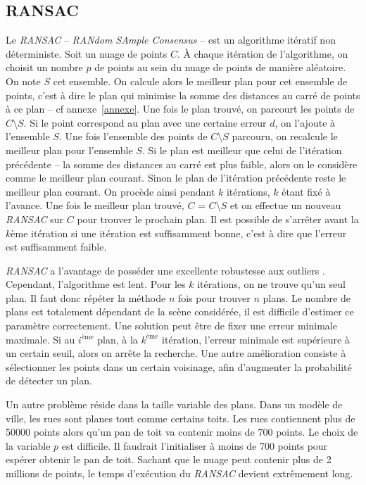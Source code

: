 ﻿\documentclass[12pt, twoside]{article}
\begin{document}
\subsection{RANSAC}
Le \textit{RANSAC} -- \textit{RANdom SAmple Consensus} -- est un algorithme itératif non déterministe. Soit un nuage de points $C$. À chaque itération de l’algorithme, on choisit un nombre $p$ de points au sein du nuage de points de manière aléatoire. On note $S$ cet ensemble. On calcule alors le meilleur plan pour cet ensemble de points, c’est à dire le plan qui minimise la somme des distances au carré de points à ce plan -- cf annexe~\ref{annexe}. Une fois le plan trouvé, on parcourt les points de $C\setminus S$. Si le point correspond au plan avec une certaine erreur $d$, on l’ajoute à l’ensemble $S$. Une fois l’ensemble des points de $C\setminus S$ parcouru, on recalcule le meilleur plan pour l’ensemble $S$. Si le plan est meilleur que celui de l’itération précédente -- la somme des distances au carré est plus faible, alors on le considère comme le meilleur plan courant. Sinon le plan de l’itération précédente reste le meilleur plan courant. On procède ainsi pendant $k$ itérations, $k$ étant fixé à l’avance. Une fois le meilleur plan trouvé, $C$ = $C\setminus S$ et on effectue un nouveau \textit{RANSAC} sur $C$ pour trouver le prochain plan. Il est possible de s’arrêter avant la $k$ème itération si une itération est suffisamment bonne, c’est à dire que l’erreur est suffisamment faible.

\textit{RANSAC} a l’avantage de posséder une excellente robustesse aux outliers \cite{RANSAC1}. Cependant, l’algorithme est lent. Pour les $k$ itérations, on ne trouve qu’un seul plan. Il faut donc répéter la méthode $n$ fois pour trouver $n$ plans. Le nombre de plans est totalement dépendant de la scène considérée, il est difficile d’estimer ce paramètre correctement. Une solution peut être de fixer une erreur minimale maximale. Si au $i^\text{ème}$ plan, à la $k^\text{ème}$ itération, l’erreur minimale est supérieure à un certain seuil, alors on arrête la recherche. Une autre amélioration consiste à sélectionner les points dans un certain voisinage, afin d’augmenter la probabilité de détecter un plan.

Un autre problème réside dans la taille variable des plans. Dans un modèle de ville, les rues sont planes tout comme certains toits. Les rues contiennent plus de 50000 points alors qu'un pan de toit va contenir moins de 700 points. Le choix de la variable $p$ est difficile. Il faudrait l'initialiser à moins de 700 points pour espérer obtenir le pan de toit. Sachant que le nuage peut contenir plus de 2 millions de points, le temps d'exécution du \textit{RANSAC} devient extrêmement long.
\end{document}
